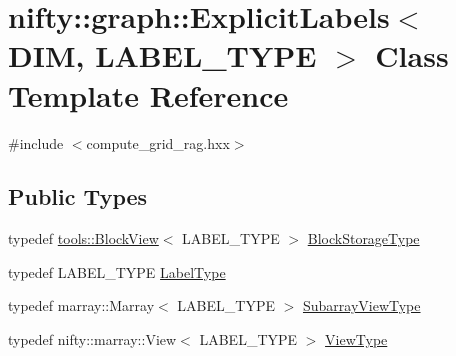 \hypertarget{classnifty_1_1graph_1_1ExplicitLabels}{}\section{nifty\+:\+:graph\+:\+:Explicit\+Labels$<$ D\+I\+M, L\+A\+B\+E\+L\+\_\+\+T\+Y\+P\+E $>$ Class Template Reference}
\label{classnifty_1_1graph_1_1ExplicitLabels}


{\ttfamily \#include $<$compute\+\_\+grid\+\_\+rag.\+hxx$>$}

\subsection*{Public Types}
\begin{DoxyCompactItemize}
\item 
typedef \hyperlink{classnifty_1_1tools_1_1BlockView}{tools\+::\+Block\+View}$<$ L\+A\+B\+E\+L\+\_\+\+T\+Y\+P\+E $>$ \hyperlink{classnifty_1_1graph_1_1ExplicitLabels_a896653b58048ec52d8e00800279d9b53}{Block\+Storage\+Type}
\item 
typedef L\+A\+B\+E\+L\+\_\+\+T\+Y\+P\+E \hyperlink{classnifty_1_1graph_1_1ExplicitLabels_a3defd2851b5e7071f23a0fdea7aafff0}{Label\+Type}
\item 
typedef marray\+::\+Marray$<$ L\+A\+B\+E\+L\+\_\+\+T\+Y\+P\+E $>$ \hyperlink{classnifty_1_1graph_1_1ExplicitLabels_ae07fe2aed8059beb43b043e8a3becdb7}{Subarray\+View\+Type}
\item 
typedef nifty\+::marray\+::\+View$<$ L\+A\+B\+E\+L\+\_\+\+T\+Y\+P\+E $>$ \hyperlink{classnifty_1_1graph_1_1ExplicitLabels_aaab98314403b95503bf0c32e65fd1884}{View\+Type}
\end{DoxyCompactItemize}
